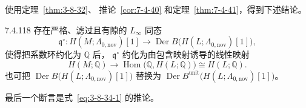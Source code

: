 使用定理~\ref{thm:3-8-32}、
推论~\ref{cor:7-4-40}
和定理~\ref{thm:7-4-41}，得到下述结论。

\begin{theorem}{7.4.118}\label{thm:7-4-118}
存在严格、滤过且有隙的 $L_\infty$ 同态
\[
\mathfrak q^{\circ}:
H(M;\Lambda_{0,\mathrm{nov}})[1]
\longrightarrow
\operatorname{Der}B
\bigl(H(L;\Lambda_{0,\mathrm{nov}})[1]\bigr),
\]
使得把系数环约化为 $\mathbb Q$ 后，
$\mathfrak q^{\circ}$ 约化为由包含映射诱导的线性映射
\[
H(M;\mathbb Q)
\longrightarrow
\operatorname{Hom}\bigl(\mathbb Q,H(L;\mathbb Q)\bigr)
\cong H(L;\mathbb Q).
\]
也可把
$\operatorname{Der}B
\bigl(H(L;\Lambda_{0,\mathrm{nov}})[1]\bigr)$
替换为
$\operatorname{Der}B^{\mathrm{unit}}
\bigl(H(L;\Lambda_{0,\mathrm{nov}})[1]\bigr)$。
\end{theorem}

最后一个断言是式~\eqref{eq:3-8-34-1} 的推论。
